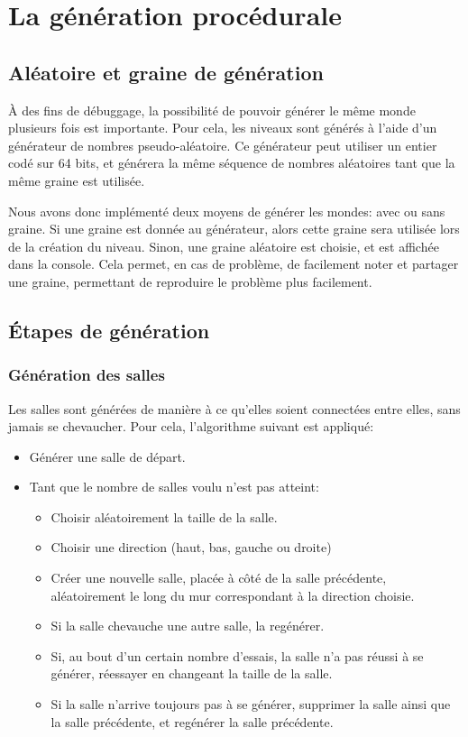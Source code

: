 \documentclass[10pt]{report}
\begin{document}
\section{La génération procédurale}
\subsection{Aléatoire et graine de génération}

À des fins de débuggage, la possibilité de pouvoir générer le même monde plusieurs fois est importante.
Pour cela, les niveaux sont générés à l'aide d'un générateur de nombres pseudo-aléatoire.
Ce générateur peut utiliser un entier codé sur 64 bits, et générera la même séquence de nombres
aléatoires tant que la même graine est utilisée. 

Nous avons donc implémenté deux moyens de générer les mondes: avec ou sans graine.
Si une graine est donnée au générateur, alors cette graine sera utilisée lors de la création du niveau.
Sinon, une graine aléatoire est choisie, et est affichée dans la console.
Cela permet, en cas de problème, de facilement noter et partager une graine, permettant de reproduire
le problème plus facilement.

\subsection{Étapes de génération}
\subsubsection{Génération des salles}

Les salles sont générées de manière à ce qu'elles soient connectées entre
elles, sans jamais se chevaucher.
Pour cela, l'algorithme suivant est appliqué:

\begin{itemize}
  \item Générer une salle de départ.
  \item Tant que le nombre de salles voulu n'est pas atteint:
  \begin{itemize}
    \item Choisir aléatoirement la taille de la salle.
    \item Choisir une direction (haut, bas, gauche ou droite)
    \item Créer une nouvelle salle, placée à côté de la salle précédente,
    aléatoirement le long du mur correspondant à la direction choisie.
    \item Si la salle chevauche une autre salle, la regénérer.
    \item Si, au bout d'un certain nombre d'essais, la salle n'a pas réussi
    à se générer, réessayer en changeant la taille de la salle.
    \item Si la salle n'arrive toujours pas à se générer, supprimer la
    salle ainsi que la salle précédente, et regénérer la salle précédente.
  \end{itemize}
\end{itemize}
\end{document}
